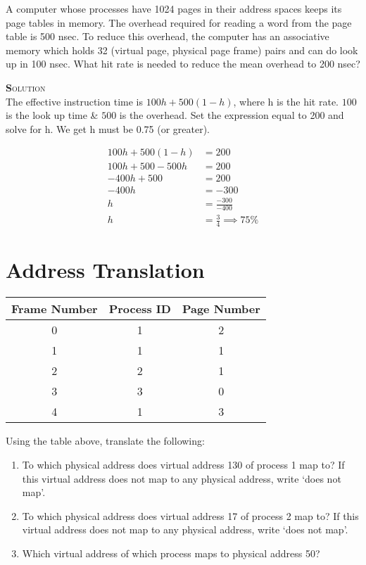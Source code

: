 \documentclass{article}
\newcommand{\smallcaps}[1]{\textsc{\textbf #1}\\}
\begin{document}
\begin{multicols}{2}
  A computer whose processes have 1024 pages in their address spaces keeps
  its page tables in memory. The overhead required for reading a word from
  the page table is 500 nsec.  To reduce this  overhead, the computer has an
  associative  memory  which holds 32 (virtual  page,  physical  page frame)
  pairs and can do look up in 100 nsec.  What hit rate is needed  to reduce
  the mean overhead to 200 nsec?

  \smallcaps{Solution}

  The effective instruction time is $100h + 500(1-h)$, where h is the
  hit rate. $100$ is the look up time \& $500$ is the overhead. Set the
  expression equal to 200 and solve for h. We get h must be 0.75 (or greater).

  \begin{align*}
    100h + 500(1-h) &= 200 \\
    100h + 500 - 500h &= 200 \\
    -400h + 500 &= 200 \\
    -400h &= -300 \\
    h &= \frac{-300}{-400} \\
    h &= \frac{3}{4} \implies 75\%
  \end{align*}

  \section*{Address Translation}
  \begin{tabular}{|c|c|c|}
    \hline
    Frame Number & Process ID & Page Number \\
    \hline
    0 & 1 & 2 \\
    \hline
    1 & 1 & 1 \\
    \hline
    2 & 2 & 1 \\
    \hline
    3 & 3 & 0 \\
    \hline
    4 & 1 & 3 \\
    \hline
  \end{tabular}

  Using the table above, translate the following:

  \begin{enumerate}
    \item To which physical address does virtual address 130 of process 1 map to?
      If this virtual address does not map to any physical address, write `does not map'.
    \item To which physical address does virtual address 17 of process 2 map to?
      If this virtual address does not map to any physical address, write `does not map'.
    \item Which virtual address of which process maps to physical address 50?
  \end{enumerate}


\end{multicols}
\end{document}
